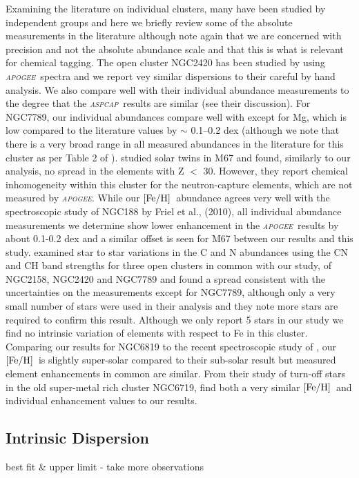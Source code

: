 \documentclass[14pt, preprint2]{aastex6}
\newcommand{\project}[1]{\textsl{#1}}
\newcommand{\apogee}{\project{\textsc{apogee}}}
\newcommand{\aspcap}{\project{\textsc{aspcap}}}
\newcommand{\feh}{\mbox{$\rm [Fe/H]$}}
\begin{document}
Examining the literature on individual clusters, many have been studied by independent groups and here we briefly review some of the absolute measurements in the literature although note again that we are concerned with precision and not the absolute abundance scale and that this is what is relevant for chemical tagging. The open cluster NGC2420 has been studied by \citet{Souto2016} using \apogee\ spectra and we report vey similar dispersions to their careful by hand analysis. We also compare well with their individual abundance measurements to the degree that the \aspcap\ results are similar (see their discussion). For NGC7789,  our individual abundances compare well with \citet{Overbeek2015} except for Mg,  which is low compared to the literature values by $\sim$ 0.1--0.2 dex (although we note that there is a very broad range in all measured abundances in the literature for this cluster as per Table 2 of \citet{Overbeek2015}). \citet{L2016} studied solar twins in M67 and found, similarly to our analysis, no spread in the elements with Z $<$ 30. However, they report chemical inhomogeneity within this cluster for the neutron-capture elements, which are not measured by \apogee. While our \feh\ abundance agrees very well with the spectroscopic study of NGC188 by Friel et al., (2010), all individual abundance measurements we determine show lower enhancement in the \apogee\ results by about 0.1-0.2 dex and a similar offset is seen for M67 between our results and this study. \citet{Car2013} examined star to star variations in the C and N abundances using the CN and CH band strengths for three open clusters in common with our study, of NGC2158, NGC2420 and NGC7789 and found a spread consistent with the uncertainties on the measurements except for NGC7789, although only a very small number of stars were used in their analysis and they note more stars are required to confirm this result. Although we only report 5 stars in our study we find no intrinsic variation of elements with respect to Fe in this cluster.  Comparing our results for NGC6819 to the recent spectroscopic study of \citet{LB2015}, our \feh\ is slightly super-solar compared to their sub-solar result but measured element enhancements in common are similar. From their study of turn-off stars in the old super-metal rich cluster NGC6719, \citet{Bo2015} find both a  very similar \feh\ and individual enhancement values to our results. 

\subsection{Intrinsic Dispersion}
best fit & upper limit - take more observations
\end{document}
